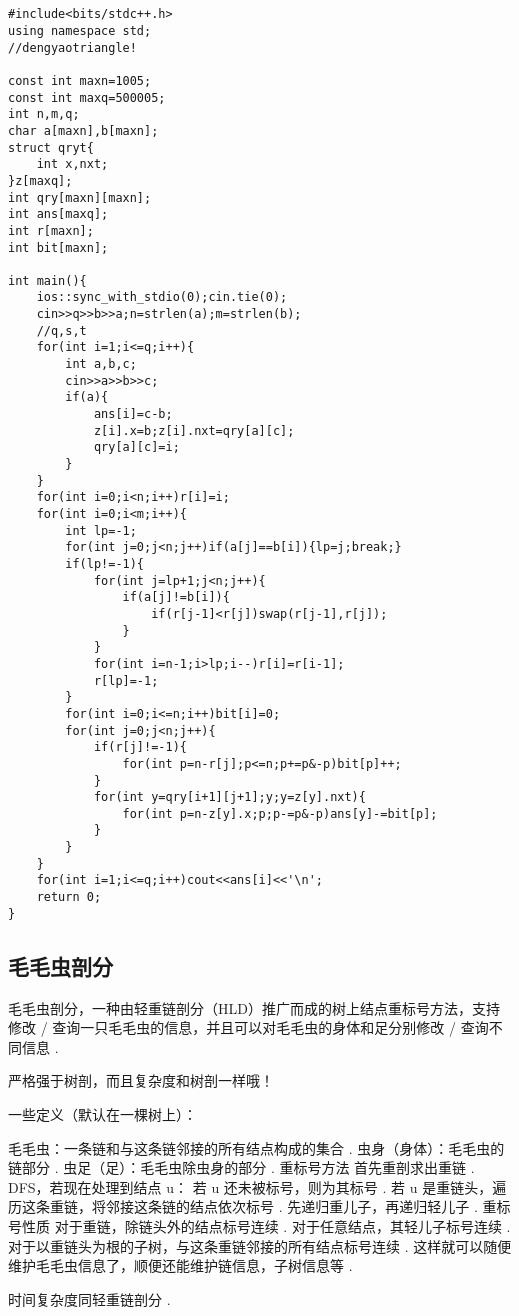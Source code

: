 \documentclass[12pt]{ctexart}
\begin{document}
\begin{lstlisting}


#include<bits/stdc++.h>
using namespace std;
//dengyaotriangle!

const int maxn=1005;
const int maxq=500005;
int n,m,q;
char a[maxn],b[maxn];
struct qryt{
    int x,nxt;
}z[maxq];
int qry[maxn][maxn];
int ans[maxq];
int r[maxn];
int bit[maxn];

int main(){
    ios::sync_with_stdio(0);cin.tie(0);
    cin>>q>>b>>a;n=strlen(a);m=strlen(b);
	//q,s,t
    for(int i=1;i<=q;i++){
        int a,b,c;
        cin>>a>>b>>c;
        if(a){
            ans[i]=c-b;
            z[i].x=b;z[i].nxt=qry[a][c];
            qry[a][c]=i;
        }
    }    
    for(int i=0;i<n;i++)r[i]=i;
    for(int i=0;i<m;i++){
        int lp=-1;
        for(int j=0;j<n;j++)if(a[j]==b[i]){lp=j;break;}
        if(lp!=-1){
            for(int j=lp+1;j<n;j++){
                if(a[j]!=b[i]){
                    if(r[j-1]<r[j])swap(r[j-1],r[j]);
                }
            }
            for(int i=n-1;i>lp;i--)r[i]=r[i-1];
            r[lp]=-1;
        }
        for(int i=0;i<=n;i++)bit[i]=0;
        for(int j=0;j<n;j++){
            if(r[j]!=-1){
                for(int p=n-r[j];p<=n;p+=p&-p)bit[p]++;
            }
            for(int y=qry[i+1][j+1];y;y=z[y].nxt){
                for(int p=n-z[y].x;p;p-=p&-p)ans[y]-=bit[p];
            }
        }
    }
    for(int i=1;i<=q;i++)cout<<ans[i]<<'\n';
    return 0;
}
\end{lstlisting}

\subsection{毛毛虫剖分}
毛毛虫剖分，一种由轻重链剖分（HLD）推广而成的树上结点重标号方法，支持修改 / 查询一只毛毛虫的信息，并且可以对毛毛虫的身体和足分别修改 / 查询不同信息 .

严格强于树剖，而且复杂度和树剖一样哦！

一些定义（默认在一棵树上）：

毛毛虫：一条链和与这条链邻接的所有结点构成的集合 .
虫身（身体）：毛毛虫的链部分 .
虫足（足）：毛毛虫除虫身的部分 .
重标号方法
首先重剖求出重链 .
DFS，若现在处理到结点 u：
若 u 还未被标号，则为其标号 .
若 u 是重链头，遍历这条重链，将邻接这条链的结点依次标号 .
先递归重儿子，再递归轻儿子 .
重标号性质
对于重链，除链头外的结点标号连续 .
对于任意结点，其轻儿子标号连续 .
对于以重链头为根的子树，与这条重链邻接的所有结点标号连续 .
这样就可以随便维护毛毛虫信息了，顺便还能维护链信息，子树信息等 .

时间复杂度同轻重链剖分 .
\end{document}
